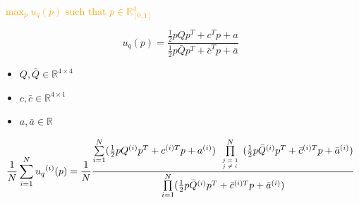 \documentclass{beamer}
\begin{document}
\begin{frame}
    \centering
     \vspace{1cm}

    
\end{frame}

\begin{frame}
    \centering
    \Large\textcolor{orange}{
    \boldmath \( \max_p u_q(p)\text{ such that }p\in\mathbb{R}_{[0,1]}^{4}\)}
\end{frame}

\begin{frame}
    \begin{center}
    \begin{lemma}
     \boldmath\[ u_q(p) = \frac{\frac{1}{2} p Q  p^T + c^T  p + a} 
    {\frac{1}{2} p \bar{Q} p^T + \bar{c}^T p + \bar{a}}\]

    \begin{itemize}
      \item \boldmath\(Q, \bar{Q} \in\mathbb{R}^{4 \times 4}\)
      \item \boldmath\(c, \bar{c}\in\mathbb{R}^{4 \times 1}\) 
      \item \boldmath\(a, \bar{a}\in\mathbb{R}\)  
   \end{itemize}
    \end{lemma}
    \end{center}
\end{frame}

\begin{frame}
    \begin{center}
    \begin{lemma}
    {\tiny
     \boldmath\[\frac{1}{N} \sum\limits_{i=1} ^ {N} {u_q}^{(i)} (p) = \frac{1}{N}
     \frac{\sum\limits_{i=1} ^ {N} (\frac{1}{2} pQ^{(i)} p^T + c^{(i)T} p + a^ {(i)})
     \prod\limits_{\tiny\begin{array}{l} j=1 \\ j \neq i \end{array}} ^ 
     N (\frac{1}{2} p\bar{Q}^{(i)} p^T + \bar{c}^{(i)T} p + \bar{a}^ {(i)})}
     {\prod\limits_{i=1} ^ N (\frac{1}{2} p\bar{Q}^{(i)} p^T + \bar{c}^{(i)T} p + \bar{a}^ {(i)})}\]}
    \end{lemma}
    \end{center}
\end{frame}

\begin{frame}
    \begin{center}
    
    \end{center}
\end{frame}
\end{document}

